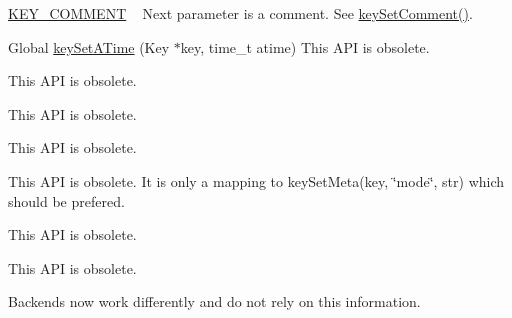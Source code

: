 \begin{DoxyRefList}
\begin{DoxyItemize}
\item \hyperlink{group__key_gga91fb3178848bd682000958089abbaf40ac29427bb47cc31689d02912e36161ee3}{K\+E\+Y\+\_\+\+C\+O\+M\+M\+E\+N\+T} ~\newline
 Next parameter is a comment. See \hyperlink{group__meta_ga8863a877a84fa46e6017fe72e49b89c1}{key\+Set\+Comment()}. 
\begin{DoxyCodeInclude}
\end{DoxyCodeInclude}
Global \hyperlink{group__meta_ga995d8b84731673c88c7c01f3fed538b9}{key\+Set\+A\+Time} (Key $\ast$key, time\+\_\+t atime) This A\+P\+I is obsolete. 
\end{DoxyItemize}
\item[\label{deprecated__deprecated000023}%
\hypertarget{deprecated__deprecated000023}{}%
Global \hyperlink{group__meta_ga9f502ecab8ab43f0b17220fcc95f3fa5}{key\+Set\+C\+Time} (Key $\ast$key, time\+\_\+t ctime)]This A\+P\+I is obsolete. 
\item[\label{deprecated__deprecated000015}%
\hypertarget{deprecated__deprecated000015}{}%
Global \hyperlink{group__meta_gaae575bd86a628a15ee45baa860522e75}{key\+Set\+Dir} (Key $\ast$key)]This A\+P\+I is obsolete. 
\item[\label{deprecated__deprecated000014}%
\hypertarget{deprecated__deprecated000014}{}%
Global \hyperlink{group__meta_ga9e3d0fb3f7ba906e067727b9155d22e3}{key\+Set\+G\+I\+D} (Key $\ast$key, gid\+\_\+t gid)]This A\+P\+I is obsolete. 
\item[\label{deprecated__deprecated000017}%
\hypertarget{deprecated__deprecated000017}{}%
Global \hyperlink{group__meta_ga8803037e35b9da1ce492323a88ff6bc3}{key\+Set\+Mode} (Key $\ast$key, mode\+\_\+t mode)]This A\+P\+I is obsolete. It is only a mapping to key\+Set\+Meta(key, \char`\"{}mode\char`\"{}, str) which should be prefered. 
\item[\label{deprecated__deprecated000021}%
\hypertarget{deprecated__deprecated000021}{}%
Global \hyperlink{group__meta_ga481d8997187992fe4bbf288bc8ef4db7}{key\+Set\+M\+Time} (Key $\ast$key, time\+\_\+t mtime)]This A\+P\+I is obsolete. 
\item[\label{deprecated__deprecated000012}%
\hypertarget{deprecated__deprecated000012}{}%
Global \hyperlink{group__meta_gab5f284f5ecd261e0a290095f50ba1af7}{key\+Set\+U\+I\+D} (Key $\ast$key, uid\+\_\+t uid)]This A\+P\+I is obsolete. 
\item[\label{deprecated__deprecated000009}%
\hypertarget{deprecated__deprecated000009}{}%
Global \hyperlink{group__keyset_ga8f210432e664d8ba06d7d55a2aba2d0f}{ks\+Need\+Sync} (const Key\+Set $\ast$ks)]Backends now work differently and do not rely on this information.
\end{DoxyRefList}